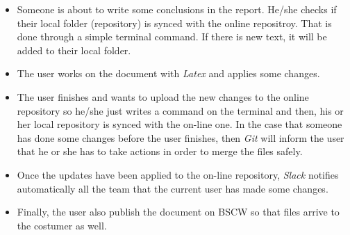 \begin{itemize}
\item Someone is about to write some conclusions in the report. He/she checks if their local folder (repository) is synced  with the online repositroy. That is done through a simple terminal command. If there is new text, it will be added to their local folder.
\item The user works on the document with \textit{Latex} and applies some changes.
\item The user finishes and wants to upload the new changes to the online repository so he/she just writes a command on the terminal and then, his or her local repository is synced with the on-line one. In the case that someone has done some changes before the user finishes, then  \textit{Git} will inform the user that he or she has to take actions in order to merge the files safely.
\item Once the updates have been applied to the on-line repository, \textit{Slack} notifies automatically all the team that the current user has made some changes.
\item Finally, the user also publish the document on BSCW so that files arrive to the costumer as well.
\end{itemize}

